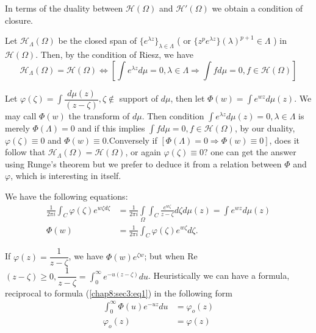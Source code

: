 In terms of the duality between $\mathscr{H}(\Omega)$ and
$\mathscr{H}' (\Omega)$ we obtain a condition of closure. 

Let $\mathscr{H}_\Lambda (\Omega)$ be the closed span of $\{e^{\lambda
 z}\}_{\lambda \in \Lambda}$ ( or $\big\{z^p e^{\lambda z}\big\}
(\lambda)^{p + 1} \in \Lambda$ ) in $\mathscr{H} (\Omega)$. Then, by
the condition of Riesz, we have 
{\fontsize{10}{12}\selectfont
$$
\mathscr{H}_\Lambda (\Omega) = \mathscr{H} (\Omega)
\Longleftrightarrow \left[ \int e^{\lambda z} d \mu = 0, \lambda \in \Lambda
 \Longrightarrow \int fd \mu = 0, f \in \mathscr{H} (\Omega)\right] 
$$}\relax

Let $\varphi(\zeta) = \int \dfrac{d \mu (z)}{(z- \zeta)}, \zeta \not\in$
support of $d \mu$, then let $\Phi (w) = \int e^{wz} d \mu (z)$. We
may call $\Phi (w)$ the transform of $d \mu$. Then condition $\int
e^{\lambda z} d \mu (z) = 0, \lambda \in \Lambda$ is merely $\Phi
(\Lambda) = 0$ and if this implies $\int f d \mu = 0, f \in
\mathscr{H}(\Omega)$, by our duality, $\varphi(\zeta) \equiv 0$ and $\Phi
(w) \equiv 0$.\pageoriginale Conversely if $[\Phi (\Lambda) = 0 \Longrightarrow
 \Phi (w) \equiv 0]$, does it follow that $\mathscr{H}_\Lambda
(\Omega) = \mathscr{H}(\Omega)$, or again $\varphi (\zeta) \equiv 0 ?$
one can get the answer using Runge's theorem but we prefer to deduce
it from a relation between $\Phi$ and $\varphi$, which is interesting
in itself. 

We have the following equations: 
\begin{align*}
 \frac{1}{2 \pi i } \int_C \varphi (\zeta) e^{w \zeta d \zeta} 
 & =\frac{1}{2 \pi i} \int\limits_\Omega \int_C \frac{e^{w \zeta}}{z -
 \zeta} d \zeta d \mu (z) = \int e^{wz} d \mu (z)\\ 
 \Phi (w) & = \frac{1}{2 \pi i} \int_C \varphi (\zeta) e^{w \zeta} d
 \zeta. \tag{1}\label{chap8:sec3:eq1} 
\end{align*}

If $\varphi (z) = \dfrac{1}{z - \zeta}$, we have $\Phi (w) e^{\zeta
 w}$; but when Re $(z - \zeta) \ge 0, \dfrac{1}{z - \zeta} =
\int^\infty_0 e^{-u(z - \zeta)} d		u$. Heuristically we
can have a formula, reciprocal to formula (\ref{chap8:sec3:eq1}) in the
following form 
\begin{align*}
 \int^\infty_0 \Phi (u) e^{-uz} du &= \varphi_o (z)
 \tag{2}\label{chap8:sec3:eq2}\\ 
 \varphi_o (z) &= \varphi (z) \tag{3}\label{chap8:sec3:eq3}
\end{align*}

